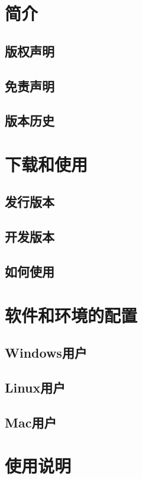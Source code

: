 \documentclass[bachelor,openright]{buaathesis}
\begin{document}
\maketitle

\frontmatter
\tableofcontents

\mainmatter
\chapter{简介}
	\section{版权声明}
	\section{免责声明}
	\section{版本历史}
	
\chapter{下载和使用}
	\section{发行版本}
	\section{开发版本}
	\section{如何使用}
	
\chapter{软件和环境的配置}
	\section{Windows用户}
	\section{Linux用户}
	\section{Mac用户}
	
\chapter{使用说明}
\end{document}
